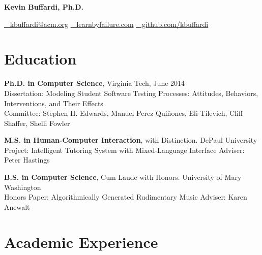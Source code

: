 \documentclass[10pt,letterpaper]{article}
\begin{document}
\begin{center}
{\LARGE\bfseries Kevin Buffardi, Ph.D.}\par
\vspace{0.25em}
{\small\href{mailto:kbuffardi@acm.org}{\faEnvelope~ kbuffardi@acm.org}
\enspace\textbar\enspace
\href{https://learnbyfailure.com}{\faGlobe~ learnbyfailure.com}
\enspace\textbar\enspace
\href{https://github.com/kbuffardi}{\faGithub~ github.com/kbuffardi}}
\end{center}

\section*{Education} \textbf{Ph.D. in Computer Science}, Virginia Tech, June 2014 \\
Dissertation: Modeling Student Software Testing Processes: Attitudes, Behaviors, Interventions, and Their Effects \\
Committee: Stephen H. Edwards, Manuel Perez-Qui\~{n}ones, Eli Tilevich, Cliff Shaffer, Shelli Fowler \\
\par \textbf{M.S. in Human-Computer Interaction}, with Distinction. DePaul University \\
Project: Intelligent Tutoring System with Mixed-Language Interface Adviser: Peter Hastings \\
\par \textbf{B.S. in Computer Science}, Cum Laude with Honors. University of Mary Washington \\
Honors Paper: Algorithmically Generated Rudimentary Music Adviser: Karen Anewalt \\
\section*{Academic Experience}
\end{document}
